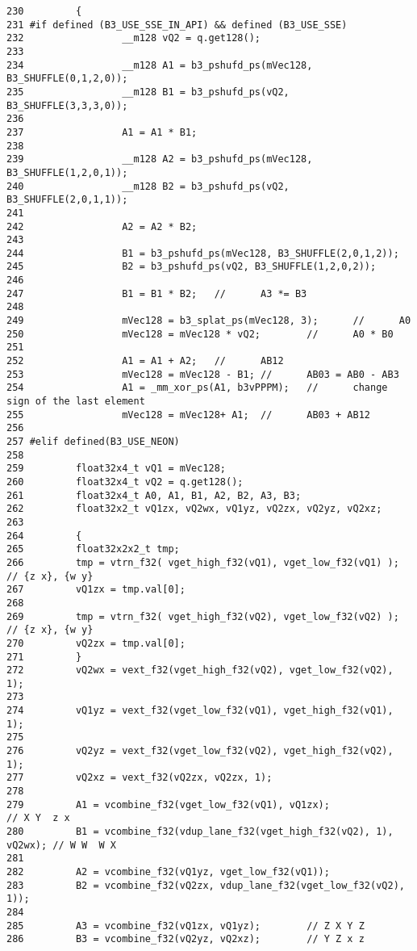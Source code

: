 \begin{Code}\begin{verbatim}230         {
231 #if defined (B3_USE_SSE_IN_API) && defined (B3_USE_SSE)
232                 __m128 vQ2 = q.get128();
233                 
234                 __m128 A1 = b3_pshufd_ps(mVec128, B3_SHUFFLE(0,1,2,0));
235                 __m128 B1 = b3_pshufd_ps(vQ2, B3_SHUFFLE(3,3,3,0));
236                 
237                 A1 = A1 * B1;
238                 
239                 __m128 A2 = b3_pshufd_ps(mVec128, B3_SHUFFLE(1,2,0,1));
240                 __m128 B2 = b3_pshufd_ps(vQ2, B3_SHUFFLE(2,0,1,1));
241                 
242                 A2 = A2 * B2;
243                 
244                 B1 = b3_pshufd_ps(mVec128, B3_SHUFFLE(2,0,1,2));
245                 B2 = b3_pshufd_ps(vQ2, B3_SHUFFLE(1,2,0,2));
246                 
247                 B1 = B1 * B2;   //      A3 *= B3
248                 
249                 mVec128 = b3_splat_ps(mVec128, 3);      //      A0
250                 mVec128 = mVec128 * vQ2;        //      A0 * B0
251                 
252                 A1 = A1 + A2;   //      AB12
253                 mVec128 = mVec128 - B1; //      AB03 = AB0 - AB3 
254                 A1 = _mm_xor_ps(A1, b3vPPPM);   //      change sign of the last element
255                 mVec128 = mVec128+ A1;  //      AB03 + AB12
256 
257 #elif defined(B3_USE_NEON)     
258 
259         float32x4_t vQ1 = mVec128;
260         float32x4_t vQ2 = q.get128();
261         float32x4_t A0, A1, B1, A2, B2, A3, B3;
262         float32x2_t vQ1zx, vQ2wx, vQ1yz, vQ2zx, vQ2yz, vQ2xz;
263         
264         {
265         float32x2x2_t tmp;
266         tmp = vtrn_f32( vget_high_f32(vQ1), vget_low_f32(vQ1) );       // {z x}, {w y}
267         vQ1zx = tmp.val[0];
268 
269         tmp = vtrn_f32( vget_high_f32(vQ2), vget_low_f32(vQ2) );       // {z x}, {w y}
270         vQ2zx = tmp.val[0];
271         }
272         vQ2wx = vext_f32(vget_high_f32(vQ2), vget_low_f32(vQ2), 1); 
273 
274         vQ1yz = vext_f32(vget_low_f32(vQ1), vget_high_f32(vQ1), 1);
275 
276         vQ2yz = vext_f32(vget_low_f32(vQ2), vget_high_f32(vQ2), 1);
277         vQ2xz = vext_f32(vQ2zx, vQ2zx, 1);
278 
279         A1 = vcombine_f32(vget_low_f32(vQ1), vQ1zx);                    // X Y  z x 
280         B1 = vcombine_f32(vdup_lane_f32(vget_high_f32(vQ2), 1), vQ2wx); // W W  W X 
281 
282         A2 = vcombine_f32(vQ1yz, vget_low_f32(vQ1));
283         B2 = vcombine_f32(vQ2zx, vdup_lane_f32(vget_low_f32(vQ2), 1));
284 
285         A3 = vcombine_f32(vQ1zx, vQ1yz);        // Z X Y Z
286         B3 = vcombine_f32(vQ2yz, vQ2xz);        // Y Z x z

\end{verbatim}
\end{Code}
